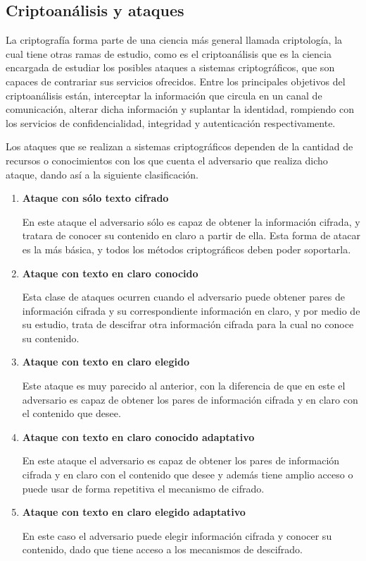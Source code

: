 
\subsection{Criptoanálisis y ataques}

  La criptografía forma parte de una ciencia más general llamada criptología, 
  la cual tiene otras ramas de estudio, como es el criptoanálisis que es la 
  ciencia encargada de estudiar los posibles ataques a sistemas criptográficos, 
  que son capaces de contrariar sus servicios ofrecidos. Entre los principales 
  objetivos del criptoanálisis están, interceptar la información que circula 
  en un canal de comunicación, alterar dicha información y suplantar la 
  identidad, rompiendo con los servicios de confidencialidad, integridad y 
  autenticación respectivamente.

  Los ataques que se realizan a sistemas criptográficos dependen de la cantidad 
  de recursos o conocimientos con los que cuenta el adversario que realiza dicho 
  ataque, dando así a la siguiente clasificación.

  \begin{enumerate}
 
    \item \textbf{Ataque con sólo texto cifrado}

      En este ataque el adversario sólo es capaz de obtener la información
      cifrada, y tratara de conocer su contenido en claro a partir de ella.
      Esta forma de atacar es la más básica, y todos los métodos
      criptográficos deben poder soportarla.

    \item \textbf{Ataque con texto en claro conocido}

      Esta clase de ataques ocurren cuando el adversario puede obtener pares
      de información cifrada y su correspondiente información en claro, y
      por medio de su estudio, trata de descifrar otra información cifrada
      para la cual no conoce su contenido.

    \item \textbf{Ataque con texto en claro elegido}

      Este ataque es muy parecido al anterior, con la diferencia de que en
      este el adversario es capaz de obtener los pares de información
      cifrada y en claro con el contenido que desee.

    \item \textbf{Ataque con texto en claro conocido adaptativo}

      En este ataque el adversario es capaz de obtener los pares de
      información cifrada y en claro con el contenido que desee y además
      tiene amplio acceso o puede usar de forma repetitiva el mecanismo de
      cifrado.

    \item \textbf{Ataque con texto en claro elegido adaptativo}

      En este caso el adversario puede elegir información cifrada y conocer
      su contenido, dado que tiene acceso a los mecanismos de descifrado.

  \end{enumerate}
